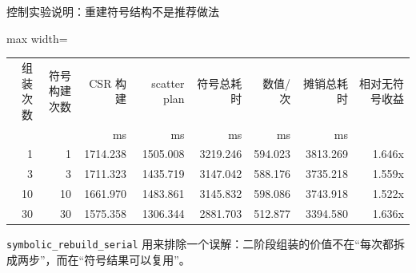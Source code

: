\documentclass[UTF8,aspectratio=169,10pt]{ctexbeamer}
\begin{document}
\begin{frame}{控制实验说明：重建符号结构不是推荐做法}
\begin{adjustbox}{max width=\textwidth}
\begin{tabular}{rrrrrrrr}
\toprule
组装次数 & 符号构建次数 & CSR 构建 & scatter plan & 符号总耗时 & 数值/次 & 摊销总耗时 & 相对无符号收益 \\
 & & ms & ms & ms & ms & ms & \\
\midrule
1  & 1  & 1714.238 & 1505.008 & 3219.246 & 594.023 & 3813.269 & 1.646x \\
3  & 3  & 1711.323 & 1435.719 & 3147.042 & 588.176 & 3735.218 & 1.559x \\
10 & 10 & 1661.970 & 1483.861 & 3145.832 & 598.086 & 3743.918 & 1.522x \\
30 & 30 & 1575.358 & 1306.344 & 2881.703 & 512.877 & 3394.580 & 1.636x \\
\bottomrule
\end{tabular}
\end{adjustbox}

\vspace{0.5em}
\texttt{symbolic\_rebuild\_serial} 用来排除一个误解：二阶段组装的价值不在“每次都拆成两步”，而在“符号结果可以复用”。
\end{frame}
\end{document}
